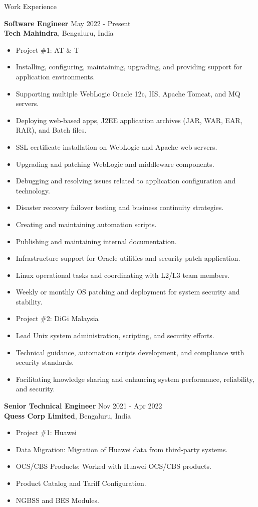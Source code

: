 \documentclass{resume} %
\begin{document}
\begin{rSection}{Work Experience}

\textbf{Software Engineer} \hfill May 2022 - Present\\
\textbf{Tech Mahindra}, Bengaluru, India
\begin{itemize}
    \item Project \#1: AT \& T
    \item Installing, configuring, maintaining, upgrading, and providing support for application environments.
    \item Supporting multiple WebLogic Oracle 12c, IIS, Apache Tomcat, and MQ servers.
    \item Deploying web-based apps, J2EE application archives (JAR, WAR, EAR, RAR), and Batch files.
    \item SSL certificate installation on WebLogic and Apache web servers.
    \item Upgrading and patching WebLogic and middleware components.
    \item Debugging and resolving issues related to application configuration and technology.
    \item Disaster recovery failover testing and business continuity strategies.
    \item Creating and maintaining automation scripts.
    \item Publishing and maintaining internal documentation.
    \item Infrastructure support for Oracle utilities and security patch application.
    \item Linux operational tasks and coordinating with L2/L3 team members.
    \item Weekly or monthly OS patching and deployment for system security and stability.
    \item Project \#2: DiGi Malaysia
    \item Lead Unix system administration, scripting, and security efforts.
    \item Technical guidance, automation scripts development, and compliance with security standards.
    \item Facilitating knowledge sharing and enhancing system performance, reliability, and security.
\end{itemize}

\textbf{Senior Technical Engineer} \hfill Nov 2021 - Apr 2022\\
\textbf{Quess Corp Limited}, Bengaluru, India
\begin{itemize}
    \item Project \#1: Huawei
    \item Data Migration: Migration of Huawei data from third-party systems.
    \item OCS/CBS Products: Worked with Huawei OCS/CBS products.
    \item Product Catalog and Tariff Configuration.
    \item NGBSS and BES Modules.
\end{itemize}


\end{rSection}
\end{document}
